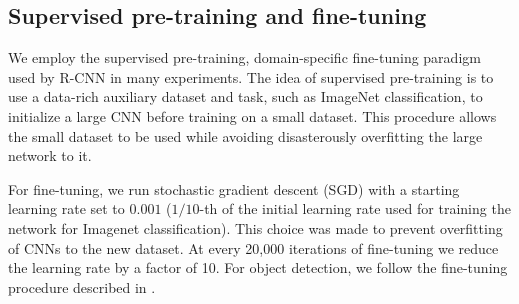 \subsection{Supervised pre-training and fine-tuning}
\label{sub:fine-train}
We employ the supervised pre-training, domain-specific fine-tuning paradigm used by R-CNN \cite{Rcnn} in many experiments.
The idea of supervised pre-training is to use a data-rich auxiliary dataset and task, such as ImageNet classification, to initialize a large CNN before training on a small dataset.
This procedure allows the small dataset to be used while avoiding disasterously overfitting the large network to it.

For fine-tuning, we run stochastic gradient descent (SGD) with a starting learning rate set to $0.001$ ($1/10$-th of the initial learning rate used for training the network for Imagenet classification). 
This choice was made to prevent overfitting of CNNs to the new dataset.
At every 20,000 iterations of fine-tuning we reduce the learning rate by a factor of 10.
For object detection, we follow the fine-tuning procedure described in \cite{Rcnn}.

